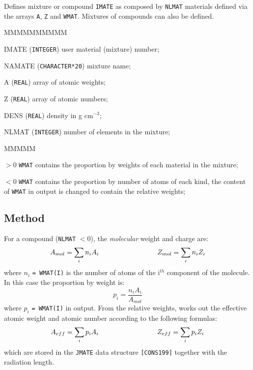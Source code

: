           
 
Defines mixture or compound {\tt IMATE} as composed by
{\tt NLMAT} materials defined via
the arrays {\tt A}, {\tt Z} and {\tt WMAT}.
Mixtures of compounds can also be defined.
 
\begin{DLtt}{MMMMMMMMMM}
\item[IMATE]({\tt INTEGER}) user material (mixture) number;
\item[NAMATE]({\tt CHARACTER*20}) mixture name;
\item[A]({\tt REAL}) array of atomic weights;
\item[Z]({\tt REAL}) array of atomic numbers;
\item[DENS]({\tt REAL}) density in g cm$^{-3}$;
\item[NLMAT]({\tt INTEGER}) number of elements in the mixture;
\begin{DLtt}{MMMMM}
\item[$> 0$]{\tt WMAT} contains the proportion
by weights of each material in the mixture;
\item[$< 0$]{\tt WMAT} contains the proportion by number of
atoms of each kind, the content of {\tt WMAT} in output is
changed to contain the relative weights;
\end{DLtt}
\end{DLtt}
 
\subsection*{Method}
For a compound ({\tt NLMAT} $< 0$), the {\it molecular} weight and charge are:
\[
A_{mol} = \sum_i n_i A_i\mbox{\hspace{3cm}} Z_{mol} = \sum_i n_i Z_i
\]
where $n_i$ {\tt = WMAT(I)} is the number of atoms of the i$^{th}$
component of the molecule. In this case the proportion by weight is:
\[
 p_i = \frac{n_i A_i}{A_{mol}}
\]
where $p_i$ {\tt = WMAT(I)} in output.
From the relative weights,
 works out the effective atomic weight and atomic number
according to the following formulas:
\[
A_{eff} = \sum_i p_i A_i \mbox{\hspace{3cm}}   Z_{eff} = \sum_i p_i Z_i
\]
which are stored in the {\tt JMATE} data structure {\tt [CONS199]}
together with the radiation length.
 
